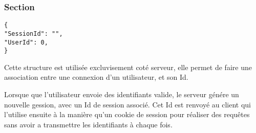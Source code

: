 \subsubsection{Section}
\begin{lstlisting}
{
"SessionId": "",
"UserId": 0,
}
\end{lstlisting}
Cette structure est utilisée excluvisement coté serveur, elle permet de faire une association entre une connexion d'un utilisateur, et son Id.\par
Lorsque que l'utilisateur envoie des identifiants valide, le serveur génére un nouvelle gession, avec un Id de session associé. Cet Id est renvoyé au client qui l'utilise ensuite à la manière qu'un cookie de session pour réaliser des requêtes sans avoir a transmettre les identifiants à chaque fois.
% 
